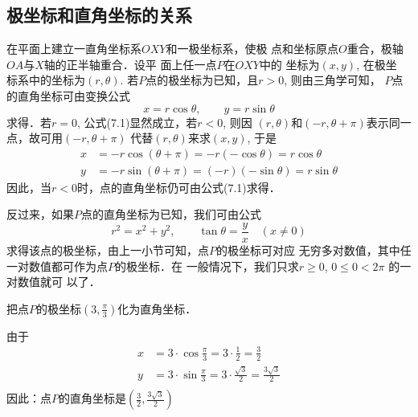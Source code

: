 \subsection{极坐标和直角坐标的关系}

\begin{figure}[htp]
    \centering
{}
    \caption{}
\end{figure}

在平面上建立一直角坐标系$OXY$和一极坐标系，使极
点和坐标原点$O$重合，极轴$OA$与$X$轴的正半轴重合．设平
面上任一点$P$在$OXY$中的
坐标为$(x,y)$, 在极坐
标系中的坐标为$(r,\theta)$. 
若$P$点的极坐标为已知，且$r>0$, 则由三角学可知，
$P$点的直角坐标可由变换公式
\begin{equation}
    x=r\cos\theta,\qquad y=r\sin\theta
\end{equation}
求得．若$r=0$, 公式(7.1)显然成立，若$r<0$, 则因
$(r,\theta)$和$(-r,\theta+\pi)$表示同一点，故可用$(-r,\theta+\pi)$
代替$(r,\theta)$来求$(x,y)$, 于是
\[\begin{split}
    x&=-r\cos(\theta +\pi )=-r(-\cos\theta )=r\cos\theta \\
    y&=-r\sin(\theta +\pi )=(-r)(-\sin\theta )=r\sin\theta 
\end{split}\]
因此，当$r<0$时，点的直角坐标仍可由公式(7.1)求得．

反过来，如果$P$点的直角坐标为已知，我们可由公式
\begin{equation}
    r^2=x^2+y^2,\qquad \tan\theta=\frac{y}{x}\quad (x\ne 0)
\end{equation}
求得该点的极坐标，由上一小节可知，点$P$的极坐标可对应
无穷多对数值，其中任一对数值都可作为点$P$的极坐标．在
一般情况下，我们只求$r\ge 0$, $0\le 0<2\pi$ 的一对数值就可
以了．

\begin{example}
    把点$P$的极坐标$\left(3,\frac{\pi}{3}\right)$化为直角坐标．
\end{example}

\begin{solution}
    由于
\[\begin{split}
    x&=3\cdot \cos \frac{\pi}{3}=3\cdot \frac{1}{2}=\frac{3}{2}\\
    y&=3\cdot \sin \frac{\pi}{3}=3\cdot \frac{\sqrt{3}}{2}=\frac{3\sqrt{3}}{2}\\
\end{split}\]
因此：点$P$的直角坐标是$\left(\frac{3}{2},\frac{3\sqrt{3}}{2}\right)$
\end{solution}

